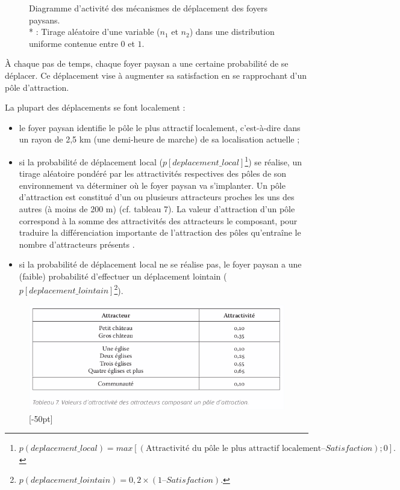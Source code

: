 {\begin{figure}[H]
	
	\caption{Diagramme d'activité des mécanismes de déplacement des foyers paysans.\\
	* : Tirage aléatoire d'une variable ($n_1$ et $n_2$) dans une distribution uniforme contenue entre $0$ et $1$.}
\end{figure}

À chaque pas de temps, chaque foyer paysan a une certaine probabilité de se déplacer.
Ce déplacement vise à augmenter sa satisfaction en se rapprochant d'un pôle d'attraction.

La plupart des déplacements se font localement :
\begin{itemize}
	\item le foyer paysan identifie le pôle le plus attractif localement, c'est-à-dire dans un rayon de 2,5 km (une demi-heure de marche) de sa localisation actuelle ;
	\item si la probabilité de déplacement local ($p[deplacement\_local]$\footnote{
$p(deplacement\_local) = max[(\text{Attractivité du pôle le plus attractif localement} – Satisfaction) ; 0].$	
}) se réalise, un tirage aléatoire pondéré par les attractivités respectives des pôles de son environnement va déterminer où le foyer paysan va s'implanter.
	Un pôle d'attraction est constitué d'un ou plusieurs attracteurs proches les uns des autres (à moins de 200 m) (cf. tableau 7).
	La valeur d'attraction d'un pôle correspond à la somme des attractivités des attracteurs le composant, pour traduire la différenciation importante de l'attraction des pôles qu'entraîne le nombre d'attracteurs présents \autocite[tableau 13, p. 96]{zadora-rio_paroisses_2008}.
	\item si la probabilité de déplacement local ne se réalise pas, le foyer paysan a une (faible) probabilité d'effectuer un déplacement lointain ($p[deplacement\_lointain]$\footnote{
	$p(deplacement\_lointain) = 0,2 × (1 – Satisfaction)$.
}).
\end{itemize}

\begin{figure}[H]
\centering
\includegraphics[width=1\linewidth]{src/Chapitre_TMD/Tab7.png}
[-50pt]
\end{figure}

}
